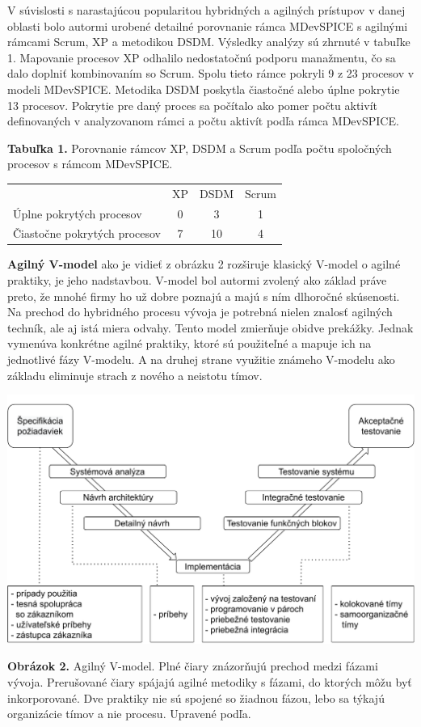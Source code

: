 \documentclass[10pt,twoside,slovak,a4paper]{article}
\begin{document}
V súvislosti s narastajúcou popularitou hybridných a agilných prístupov v danej oblasti bolo autormi urobené detailné porovnanie rámca MDevSPICE s agilnými rámcami Scrum, XP a metodikou DSDM. Výsledky analýzy sú zhrnuté v tabuľke 1. Mapovanie procesov XP odhalilo nedostatočnú podporu manažmentu, čo sa dalo doplniť kombinovaním so Scrum. Spolu tieto rámce pokryli 9 z 23 procesov v modeli MDevSPICE. Metodika DSDM poskytla čiastočné alebo úplne pokrytie 13 procesov. Pokrytie pre daný proces sa počítalo ako pomer počtu aktivít definovaných v analyzovanom rámci a počtu aktivít podľa rámca MDevSPICE\cite{mccaffery2019}. 
\medskip

\noindent\textbf{Tabuľka 1.} Porovnanie rámcov XP, DSDM a Scrum podľa počtu spoločných procesov s rámcom MDevSPICE.
\begin{table}[h!]
\centering
\begin{tabular}{l|c|c|c|}
 & XP & DSDM & Scrum \\
Úplne pokrytých procesov     & 0  & 3    & 1 \\
Čiastočne pokrytých procesov & 7  & 10   & 4 \\
\end{tabular}
\end{table}
\medskip

\textbf{Agilný V-model} ako je vidieť z obrázku 2 rozširuje klasický V-model o agilné praktiky, je jeho nadstavbou. V-model bol autormi zvolený ako základ práve preto, že mnohé firmy ho už dobre poznajú a majú s ním dlhoročné skúsenosti. Na prechod do hybridného procesu vývoja je potrebná nielen znalosť agilných techník, ale aj istá miera odvahy. Tento model zmierňuje obidve prekážky. Jednak vymenúva konkrétne agilné praktiky, ktoré sú použiteľné a mapuje ich na jednotlivé fázy V-modelu. A na druhej strane využitie známeho V-modelu ako základu eliminuje strach z nového a neistotu tímov\cite{mchugh2013}.

\begin{center}
\includegraphics[scale=0.5]{avmodel.pdf}
\end{center}
\textbf{Obrázok 2.} Agilný V-model. Plné čiary znázorňujú prechod medzi fázami vývoja. Prerušované čiary spájajú agilné metodiky s fázami, do ktorých môžu byť inkorporované. Dve praktiky nie sú spojené so žiadnou fázou, lebo sa týkajú organizácie tímov a nie procesu. Upravené podľa\cite{mchugh2013}.
\medskip
\end{document}
